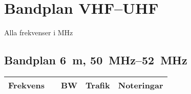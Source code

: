 \newpage

\section{Bandplan VHF--UHF}
\label{Bandplan VHF och hoegre}

Alla frekvenser i \unit{\mega\hertz}

\subsection{Bandplan \qty{6}{\metre}, \SIrange{50}{52}{\mega\hertz}}
\label{50MHZbandplan}

\begin{tabular}{rrrll}
\textbf{Frekvens} &        & \textbf{BW} & \textbf{Trafik}
& \textbf{Noteringar} \\ \hline


\end{tabular}
